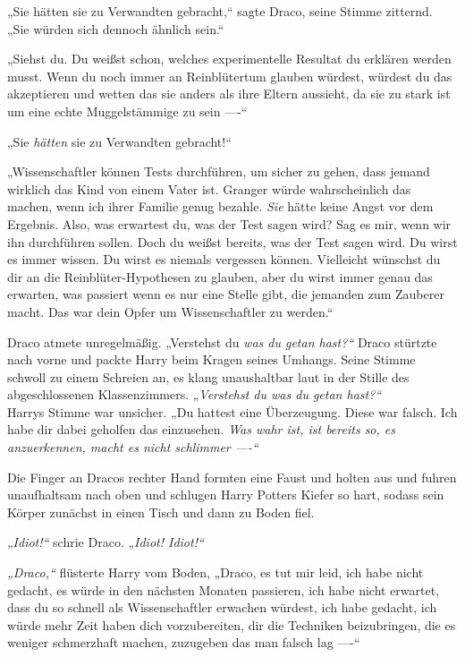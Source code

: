 {„Sie hätten sie zu Verwandten gebracht,“ sagte Draco, seine Stimme zitternd. „Sie würden sich dennoch ähnlich sein.“

„Siehst du. Du weißst schon, welches experimentelle Resultat du erklären werden musst. Wenn du noch immer an Reinblütertum glauben würdest, würdest du das akzeptieren und wetten das sie anders als ihre Eltern aussieht, da sie zu stark ist um eine echte Muggelstämmige zu sein ----“

„Sie \emph{hätten} sie zu Verwandten gebracht!“

„Wissenschaftler können Tests durchführen, um sicher zu gehen, dass jemand wirklich das Kind von einem Vater ist. Granger würde wahrscheinlich das machen, wenn ich ihrer Familie genug bezahle. \emph{Sie} hätte keine Angst vor dem Ergebnis. Also, was erwartest du, was der Test sagen wird? Sag es mir, wenn wir ihn durchführen sollen. Doch du weißst bereits, was der Test sagen wird. Du wirst es immer wissen. Du wirst es niemals vergessen können. Vielleicht wünschst du dir an die Reinblüter-Hypothesen zu glauben, aber du wirst immer genau das erwarten, was passiert wenn es nur eine Stelle gibt, die jemanden zum Zauberer macht. Das war dein Opfer um Wissenschaftler zu werden.“

Draco atmete unregelmäßig. „Verstehst du \emph{was du getan hast?“} Draco stürtzte nach vorne und packte Harry beim Kragen seines Umhangs. Seine Stimme schwoll zu einem Schreien an, es klang unaushaltbar laut in der Stille des abgeschlossenen Klassenzimmers. „\emph{Verstehst du was du getan hast?“}\\ Harrys Stimme war unsicher. „Du hattest eine Überzeugung. Diese war falsch. Ich habe dir dabei geholfen das einzusehen. \emph{Was wahr ist, ist bereits so, es anzuerkennen, macht es nicht schlimmer ----“}

Die Finger an Dracos rechter Hand formten eine Faust und holten aus und fuhren unaufhaltsam nach oben und schlugen Harry Potters Kiefer so hart, sodass sein Körper zunächst in einen Tisch und dann zu Boden fiel.

„\emph{Idiot!“} schrie Draco. „\emph{Idiot! Idiot!“}

\emph{„Draco,“} flüsterte Harry vom Boden, „Draco, es tut mir leid, ich habe nicht gedacht, es würde in den nächsten Monaten passieren, ich habe nicht erwartet, dass du so schnell als Wissenschaftler erwachen würdest, ich habe gedacht, ich würde mehr Zeit haben dich vorzubereiten, dir die Techniken beizubringen, die es weniger schmerzhaft machen, zuzugeben das man falsch lag ----“

}
